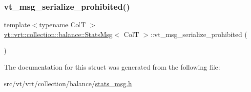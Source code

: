 \mbox{\label{structvt_1_1vrt_1_1collection_1_1balance_1_1_stats_msg_a3b71dc47eec1881fb243bf50e20f9a44}} 
\subsubsection{\texorpdfstring{vt\+\_\+msg\+\_\+serialize\+\_\+prohibited()}{vt\_msg\_serialize\_prohibited()}}
{\footnotesize\ttfamily template$<$typename ColT $>$ \\
\hyperlink{structvt_1_1vrt_1_1collection_1_1balance_1_1_stats_msg}{vt\+::vrt\+::collection\+::balance\+::\+Stats\+Msg}$<$ ColT $>$\+::vt\+\_\+msg\+\_\+serialize\+\_\+prohibited (\begin{DoxyParamCaption}{ }\end{DoxyParamCaption})}



The documentation for this struct was generated from the following file\+:\begin{DoxyCompactItemize}
\item 
src/vt/vrt/collection/balance/\hyperlink{stats__msg_8h}{stats\+\_\+msg.\+h}\end{DoxyCompactItemize}
